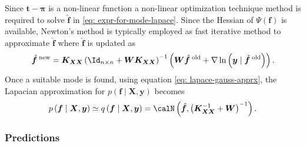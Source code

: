 Since $\bm{t} - \bm{\pi}$ is a non-linear function a non-linear optimization technique method is required to solve $\hat{\bm{f}}$ in \ref{eq: expr-for-mode-lapace}. Since the Hessian of $\Psi \left( \bm{f} \right)$ is available, Newton's method is typically employed as fast iterative method to approximate $\hat{\bm{f}}$ where $\hat{\bm{f}}$ is updated as
\begin{equation*}
    \hat{\bm{f}}^{\; \text{new}} = \bm{K}_{\bm{X} \bm{X}} \left( \Id_{n \times n} + \bm{W} \bm{K}_{\bm{X} \bm{X}} \right)^{-1} \left( \bm{W} \hat{\bm{f}}^{\; \text{old}} + \nabla \ln \left( \bm{y} \mid \hat{\bm{f}}^{\; \text{old}} \right) \right).
\end{equation*}
Once a suitable mode is found, using equation \ref{eq: lapace-gauss-apprx}, the Lapacian approximation for $p \left( \bm{f} \mid \bm{X} , \bm{y} \right)$ becomes
\begin{equation} \label{eq: lapace-apprx}
    p \left( \bm{f} \mid \bm{X} , \bm{y} \right) \simeq q \left( \bm{f} \mid \bm{X} , \bm{y} \right) = \calN \left( \hat{\bm{f}} , \left( \bm{K}_{\bm{X} \bm{X}}^{-1} + \bm{W} \right)^{-1} \right).
\end{equation}

\subsubsection{Predictions}\label{Section1.6.3}

